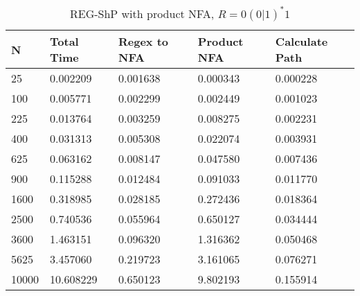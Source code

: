 \documentclass[]{article}
\numberwithin{equation}{section}
\begin{document}
\begin{appendices}
\begin{table}[H]
	\centering
	\small
	\setlength\tabcolsep{2pt}
	\begin{tabular}{|l|l|l|l|l|}
		\hline
		N     & Total Time  & Regex to NFA & Product NFA  & Calculate Path  \\ \hline
		25    & 0.002209    & 0.001638     & 0.000343     & 0.000228        \\ \hline
		100   & 0.005771    & 0.002299     & 0.002449     & 0.001023  	    \\ \hline
		225   & 0.013764    & 0.003259     & 0.008275     & 0.002231  		\\ \hline
		400   & 0.031313    & 0.005308     & 0.022074     & 0.003931  		\\ \hline
		625   & 0.063162    & 0.008147     & 0.047580     & 0.007436  		\\ \hline
		900   & 0.115288    & 0.012484     & 0.091033     & 0.011770  		\\ \hline
		1600  & 0.318985    & 0.028185     & 0.272436     & 0.018364  		\\ \hline
		2500  & 0.740536    & 0.055964     & 0.650127     & 0.034444  		\\ \hline
		3600  & 1.463151    & 0.096320     & 1.316362     & 0.050468  		\\ \hline
		5625  & 3.457060    & 0.219723     & 3.161065     & 0.076271  		\\ \hline
		10000 & 10.608229   & 0.650123     & 9.802193     & 0.155914  		\\ \hline
	\end{tabular}
	\caption{REG-ShP with product NFA, $R = 0(0|1)^*1$}
\end{table}


\end{appendices}
\end{document}
